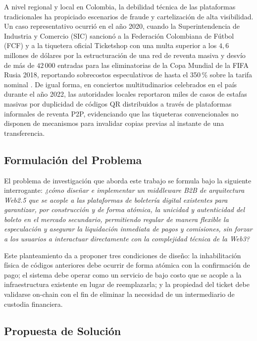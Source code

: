 A nivel regional y local en Colombia, la debilidad técnica de las plataformas tradicionales ha propiciado
escenarios de fraude y 
cartelización de alta visibilidad. Un caso representativo ocurrió en el año 2020, cuando la Superintendencia
de Industria y 
Comercio (SIC) sancionó a la Federación Colombiana de Fútbol (FCF) y a la tiquetera oficial Ticketshop con
una multa superior a 
los $4{,}6$\,millones de dólares por la estructuración de una red de reventa masiva y desvío de más de
$42\,000$ entradas para las 
eliminatorias de la Copa Mundial de la FIFA Rusia 2018, reportando sobrecostos especulativos de hasta el 350\,\% sobre la tarifa 
nominal \cite{sic2020}. De igual forma, en conciertos multitudinarios celebrados en el país durante el año
2022, las autoridades 
locales reportaron miles de casos de estafas masivas por duplicidad de códigos QR distribuidos a través de
plataformas informales de 
reventa P2P, evidenciando que las tiqueteras convencionales no disponen de mecanismos para invalidar copias
previas al instante de una 
transferencia.

\subsection{Formulación del Problema}

El problema de investigación que aborda este trabajo se formula bajo la siguiente interrogante: 
\textit{¿cómo diseñar e implementar un middleware B2B de arquitectura Web2.5 que se acople a las plataformas
de boletería 
digital existentes para garantizar, por construcción y de forma atómica, la unicidad y autenticidad del
boleto en el mercado 
secundario, permitiendo regular de manera flexible la especulación y asegurar la liquidación inmediata de
pagos y comisiones, 
sin forzar a los usuarios a interactuar directamente con la complejidad técnica de la Web3?}

Este planteamiento da a proponer tres condiciones de diseño: la inhabilitación física de códigos anteriores
debe ocurrir de 
forma atómica con la confirmación de pago; el sistema debe operar como un servicio de bajo costo que se
acople a la infraestructura 
existente en lugar de reemplazarla; y la propiedad del ticket debe validarse on-chain con el fin de eliminar
la necesidad de un 
intermediario de custodia financiera.

\subsection{Propuesta de Solución}

